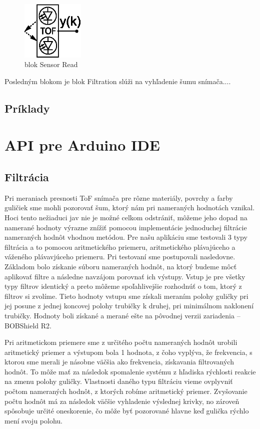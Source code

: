 \begin{figure}
	\centering
	\includegraphics[width=30mm]{obr/SensorRead.eps}
	\caption{blok Sensor Read}\label{OBRAZOK 3.1.3} 
\end{figure} 

Posledným blokom je blok Filtration slúži na vyhľadenie šumu snímača....


\subsection{Príklady}
\label{kap:3.2.2}

\section{API pre Arduino IDE}
\label{kap:3.3}

\subsection{Filtrácia}
\label{kap:3.3.1}

Pri meraniach presnosti ToF snímača pre rôzne materiály, povrchy a farby guličiek sme mohli pozorovať šum, ktorý nám pri nameraných hodnotách vznikal. Hoci tento nežiaduci jav nie je možné celkom odstrániť, môžeme jeho dopad na namerané hodnoty výrazne znížiť pomocou implementácie jednoduchej filtrácie nameraných hodnôt vhodnou metódou.
Pre našu aplikáciu sme testovali 3 typy filtrácia a to pomocou aritmetického priemeru, aritmetického plávajúceho a váženého plávavjúceho priemeru. Pri testovaní sme postupovali nasledovne. Základom bolo získanie súboru nameraných hodnôt, na ktorý budeme môcť aplikovať filtre a následne navzájom porovnať ich výstupy. Vstup je pre všetky typy filtrov identický a preto môžeme spoľahlivejšie rozhodnúť o tom, ktorý z filtrov si zvolíme. Tieto hodnoty vstupu sme získali meraním polohy guličky pri jej posune z jednej koncovej polohy trubičky k druhej, pri minimálnom naklonení trubičky. Hodnoty boli získané a merané ešte na pôvodnej verzii zariadenia – BOBShield R2. 

Pri aritmetickom priemere sme z určitého počtu nameraných hodnôt urobili aritmetický priemer a výstupom bola 1 hodnota, z čoho vyplýva, že frekvencia, s ktorou sme merali je násobne väčšia ako frekvencia, získavania filtrovaných hodnôt. To môže mať za následok spomalenie systému z hľadiska rýchlosti reakcie na zmenu polohy guličky. Vlastnosti daného typu filtráciu vieme ovplyvniť počtom nameraných hodnôt, z ktorých robíme aritmetický priemer. Zvyšovanie počtu hodnôt má za následok väčšie vyhladenie výslednej krivky, no zároveň spôsobuje určité oneskorenie, čo môže byť pozorované hlavne keď gulička rýchlo mení svoju polohu. 

